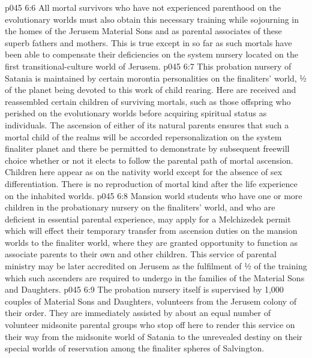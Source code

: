 \vs p045 6:6 All mortal survivors who have not experienced parenthood on the evolutionary worlds must also obtain this necessary training while sojourning in the homes of the Jerusem Material Sons and as parental associates of these superb fathers and mothers. This is true except in so far as such mortals have been able to compensate their deficiencies on the system nursery located on the first transitional\hyp{}culture world of Jerusem.
\vs p045 6:7 \pc This probation nursery of Satania is maintained by certain morontia personalities on the finaliters’ world, ½ of the planet being devoted to this work of child rearing. Here are received and reassembled certain children of surviving mortals, such as those offspring who perished on the evolutionary worlds before acquiring spiritual status as individuals. The ascension of either of its natural parents ensures that such a mortal child of the realms will be accorded repersonalization on the system finaliter planet and there be permitted to demonstrate by subsequent freewill choice whether or not it elects to follow the parental path of mortal ascension. Children here appear as on the nativity world except for the absence of sex differentiation. There is no reproduction of mortal kind after the life experience on the inhabited worlds.
\vs p045 6:8 Mansion world students who have one or more children in the probationary nursery on the finaliters’ world, and who are deficient in essential parental experience, may apply for a Melchizedek permit which will effect their temporary transfer from ascension duties on the mansion worlds to the finaliter world, where they are granted opportunity to function as associate parents to their own and other children. This service of parental ministry may be later accredited on Jerusem as the fulfilment of ½ of the training which such ascenders are required to undergo in the families of the Material Sons and Daughters.
\vs p045 6:9 The probation nursery itself is supervised by 1,000 couples of Material Sons and Daughters, volunteers from the Jerusem colony of their order. They are immediately assisted by about an equal number of volunteer midsonite parental groups who stop off here to render this service on their way from the midsonite world of Satania to the unrevealed destiny on their special worlds of reservation among the finaliter spheres of Salvington.
